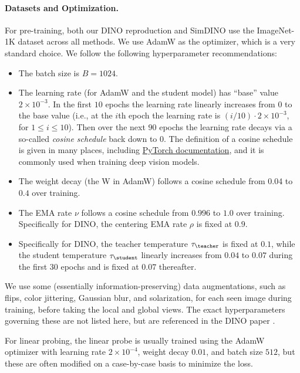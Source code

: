 \documentclass[../../book-main.tex]{subfiles}
\begin{document}
\paragraph{Datasets and Optimization.} For pre-training, both our
DINO reproduction and SimDINO use the ImageNet-1K dataset across all
methods. We use AdamW \citep{Loshchilov2017DecoupledWD} as the
optimizer, which is a very standard choice. We follow the following
hyperparameter recommendations:
\begin{itemize}
\item The batch size is \(B = 1024\).
\item The learning rate (for AdamW and the student model) has
    ``base'' value \(2 \times 10^{-3}\). In the first \(10\) epochs
    the learning rate linearly increases from \(0\) to the base value
    (i.e., at the \(i\)th epoch the learning rate is \((i/10) \cdot 2
    \times 10^{-3}\), for \(1 \leq i \leq 10\)). Then over the next
    \(90\) epochs the learning rate decays via a so-called
    \textit{cosine schedule} back down to \(0\). The definition of a
    cosine schedule is given in many places, including
    \href{https://pytorch.org/docs/stable/generated/torch.optim.lr_scheduler.CosineAnnealingLR.html}{PyTorch
    documentation}, and it is commonly used when training deep vision models.
\item The weight decay (the W in AdamW) follows a cosine schedule
    from 0.04 to \(0.4\) over training.
\item The EMA rate \(\nu\) follows a cosine schedule from \(0.996\)
    to \(1.0\) over training. Specifically for DINO, the centering
    EMA rate \(\rho\) is fixed at \(0.9\).
\item Specifically for DINO, the teacher temperature
    \(\tau_{\teacher}\) is fixed at \(0.1\), while the student
    temperature \(\tau_{\student}\) linearly increases from \(0.04\)
    to \(0.07\) during the first \(30\) epochs and is fixed at
    \(0.07\) thereafter.
\end{itemize}
We use some (essentially information-preserving) data augmentations,
such as flips, color jittering, Gaussian blur, and solarization, for
each seen image during training, before taking the local and global
views. The exact hyperparameters governing these are not listed here,
but are referenced in the DINO paper \citep{caron2021emerging}.

For linear probing, the linear probe is usually trained using the
AdamW optimizer with learning rate \(2 \times 10^{-4}\), weight decay
\(0.01\), and batch size \(512\), but these are often modified on a
case-by-case basis to minimize the loss.
\end{document}
